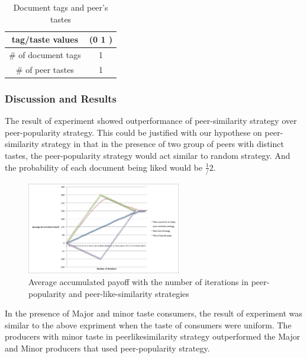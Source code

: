 \documentclass [12pt]{article} \usepackage{multicol}
\begin{document}
\begin{table}[h!]
\caption{Document tags and peer's tastes}

\begin{center}

\begin{tabular}{|c|c|}
\hline tag/taste values & (0 1 )\\
\hline \# of document tags   &  1\\ \hline 
\# of peer tastes  &  1 \\ \hline 
\end{tabular}

\end{center}
\label{default}
\end{table}


\subsubsection{Discussion and Results}

The result of experiment showed outperformance of peer-similarity strategy over peer-popularity strategy. 
This could be justified with our hypothese on peer-similarity strategy in that in the presence of two
group of peers with distinct tastes, the peer-popularity strategy would act similar to random strategy. And the probability
of each document being liked would be $\frac{1}/{2}$.  

\begin{figure}[h!]
\begin{center}
\includegraphics[width=0.6\textwidth,center]{images/peer-pop-peer-sim-2taste}
\caption{Average accumulated payoff with the number of iterations in peer-popularity and peer-like-similarity strategies}
\label{fig:images/EXP3-2}
\end{center}
\end{figure}

In the presence of Major and minor taste consumers, the result of experiment was similar to the above expriment when the taste of
consumers were uniform. The producers with minor taste in peer\-like\-similarity strategy outperformed the Major and Minor producers that used peer-popularity
strategy. 
\end{document}
